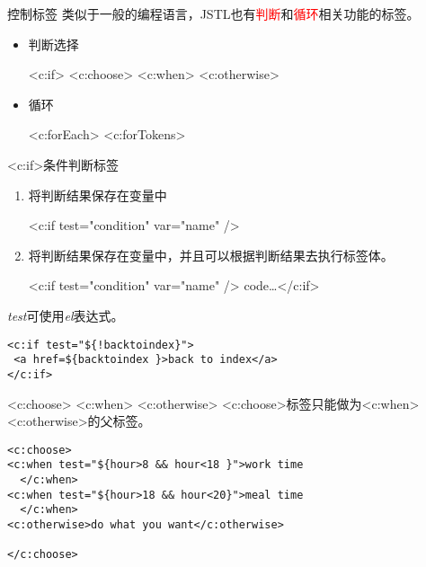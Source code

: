 \documentclass{beamer}
\begin{document}
\begin{frame}{控制标签}
类似于一般的编程语言，JSTL也有\textcolor{red}{判断}和\textcolor{red}{循环}相关功能的标签。
\begin{itemize}
\item
判断选择

<c:if> <c:choose> <c:when> <c:otherwise>
\item
循环

<c:forEach> <c:forTokens>
\end{itemize}

\end{frame}
\begin{frame}[fragile]{<c:if>条件判断标签}
\begin{enumerate}
\item
将判断结果保存在变量中

<c:if test="condition" var="name" />
\item
将判断结果保存在变量中，并且可以根据判断结果去执行标签体。

<c:if test="condition" var="name" /> code\ldots </c:if>
\end{enumerate}
\emph{test}可使用\emph{el}表达式。
\begin{block}{}
\begin{lstlisting}
<c:if test="${!backtoindex}">
 <a href=${backtoindex }>back to index</a>
</c:if>
\end{lstlisting}
\end{block}
\end{frame}
\begin{frame}[fragile]{<c:choose> <c:when> <c:otherwise>}
<c:choose>标签只能做为<c:when> <c:otherwise>的父标签。
\begin{block}{}
\begin{lstlisting}
<c:choose>
<c:when test="${hour>8 && hour<18 }">work time
  </c:when>
<c:when test="${hour>18 && hour<20}">meal time
  </c:when>
<c:otherwise>do what you want</c:otherwise>

</c:choose>
\end{lstlisting}
\end{block}
\end{frame}
\end{document}
